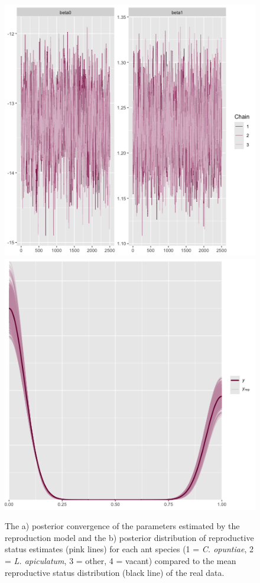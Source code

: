 \documentclass[11pt]{article}
\begin{document}
\begin{figure}
\includegraphics[width = 0.45\linewidth]{Figures/repro_conv.png}
\includegraphics[width=0.45\linewidth]{Figures/repro_post.png}
\caption{The a) posterior convergence of the parameters estimated by the reproduction model and the b) posterior distribution of reproductive status estimates (pink lines) for each ant species (1 = \textit{C. opuntiae}, 2 = \textit{L. apiculatum}, 3 = other, 4 = vacant) compared to the mean reproductive status distribution (black line) of the real data.}
\label{fig:Repro_post}
\end{figure}
\end{document}
